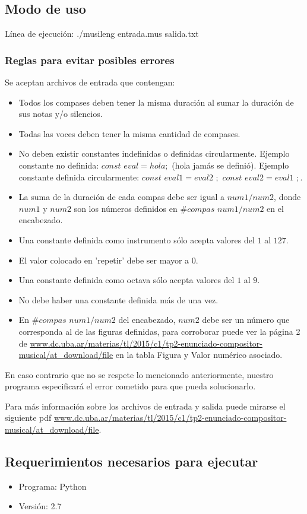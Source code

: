 \subsection{Modo de uso}
Línea de ejecución: ./musileng entrada.mus salida.txt

\subsubsection{Reglas para evitar posibles errores}
Se aceptan archivos de entrada que contengan:
\begin{itemize}
\item Todos los compases deben tener la misma duración al sumar la duración de sus notas y/o silencios.
\item Todas las voces deben tener la misma cantidad de compases.
\item No deben existir constantes indefinidas o definidas circularmente. Ejemplo constante no definida: $const$ $eval = hola;$ (hola jamás se definió). Ejemplo constante definida circularmente: $const$ $eval1 = eval2$ $;$ $const$ $eval2 = eval1$ $;$.
\item La suma de la duración de cada compas debe ser igual a $num1/num2$, donde $num1$ y $num2$ son los números definidos en $\#compas$ $num1/num2$ en el encabezado.
\item Una constante definida como instrumento sólo acepta valores del $1$ al $127$.
\item El valor colocado en 'repetir' debe ser mayor a $0$.
\item Una constante definida como octava sólo acepta valores del $1$ al $9$.
\item No debe haber una constante definida más de una vez.
\item En $\#compas$ $num1/num2$ del encabezado, $num2$ debe ser un número que corresponda al de las figuras definidas, para corroborar puede ver la página 2 de \url{www.dc.uba.ar/materias/tl/2015/c1/tp2-enunciado-compositor-musical/at_download/file} en la tabla Figura y Valor numérico asociado.
\end{itemize}
En caso contrario que no se respete lo mencionado anteriormente, nuestro programa especificará el error cometido para que pueda solucionarlo.

Para más información sobre los archivos de entrada y salida puede mirarse el siguiente pdf \url{www.dc.uba.ar/materias/tl/2015/c1/tp2-enunciado-compositor-musical/at_download/file}.

\subsection{Requerimientos necesarios para ejecutar}
\begin{itemize}
\item Programa: Python
\item Versión: 2.7
\end{itemize}

